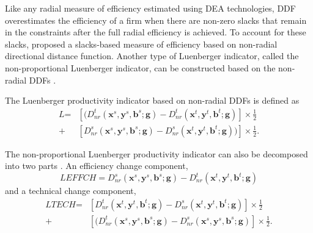 Like any radial measure of efficiency estimated using DEA technologies, DDF overestimates the efficiency of a firm when there are non-zero slacks that remain in the constraints after the full radial efficiency is achieved. 
To account for these slacks, \cite{Fare2010} proposed a slacks-based measure of efficiency based on non-radial directional distance function. Another type of Luenberger indicator, called the non-proportional Luenberger indicator, can be constructed based on the non-radial DDFs \citep{Mahlberg2011}. 

The Luenberger productivity indicator based on non-radial DDFs is defined as
\begin{equation}\begin{split}\label{eq_li_nr}
    \textit{L} %
    = & \left[ (D _{nr}^t({{\pmb{x}}^s},{{\pmb{y}}^s},{{\pmb{b}}^s};{\pmb{g}}) - D _{nr}^t({{\pmb{x}}^t},{{\pmb{y}}^t},{{\pmb{b}}^t};{\pmb{g}}) \right] \times \frac{1}{2} \\ 
    + & \left[ D _{nr}^s({{\pmb{x}}^s},{{\pmb{y}}^s},{{\pmb{b}}^s};{\pmb{g}}) - D _{nr}^s({{\pmb{x}}^t},{{\pmb{y}}^t},{{\pmb{b}}^t};{\pmb{g}})) \right] \times \frac{1}{2}.
\end{split}\end{equation}

The non-proportional Luenberger productivity indicator can also be decomposed into two parts \citep{Mahlberg2011}. An efficiency change component,
\begin{equation}
    \textit{LEFFCH} %
    = D _{nr}^s({{\pmb{x}}^s},{{\pmb{y}}^s},{{\pmb{b}}^s};{\pmb{g}}) - D _{nr}^t({{\pmb{x}}^t},{{\pmb{y}}^t},{{\pmb{b}}^t};{\pmb{g}})
\end{equation}
and a technical change component,
\begin{equation}\begin{split}
    \textit{LTECH} %
    = & \left[ D _{nr}^t({{\pmb{x}}^t},{{\pmb{y}}^t},{{\pmb{b}}^t};{\pmb{g}}) - D _{nr}^s({{\pmb{x}}^t},{{\pmb{y}}^t},{{\pmb{b}}^t};{\pmb{g}}) \right] \times \frac{1}{2} \\ 
    + & \left[ (D _{nr}^t({{\pmb{x}}^s},{{\pmb{y}}^s},{{\pmb{b}}^s};{\pmb{g}}) - D _{nr}^s({{\pmb{x}}^s},{{\pmb{y}}^s},{{\pmb{b}}^s};{\pmb{g}}) \right] \times \frac{1}{2}.
\end{split}\end{equation}


